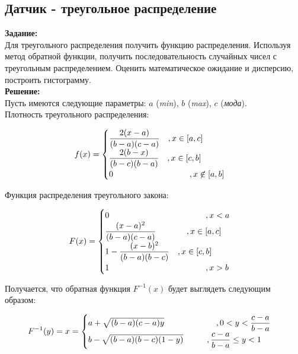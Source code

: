 \subsection*{Датчик - треугольное распределение}

\textbf{Задание:}\\
Для треугольного распределения получить функцию распределения. Используя метод обратной функции, получить последовательность случайных чисел с треугольным распределением. Оценить математическое ожидание и дисперсию, построить гистограмму.\\

\textbf{Решение:}\\
Пусть имеются следующие параметры: $a$ (\textit{min}), $b$ (\textit{max}), $c$ (\textit{мода}).\\
Плотность треугольного распределения:
\begin{ceqn}
	\begin{align*}
		f(x) =
		\begin{cases}
			\dfrac{2(x-a)}{(b-a)(c-a)} \quad , x \in [a,c]\\
			\dfrac{2(b-x)}{(b-c)(b-a)} \quad , x \in [c,b]\\
			0 \hspace{3.25cm} , x \centernot\in [a,b]\\
		\end{cases}
	\end{align*}
\end{ceqn}

Функция распределения треугольного закона:
\begin{ceqn}
	\begin{align*}
		F(x) =
		\begin{cases}
			0 \hspace{4.1cm} , x < a\\
			\dfrac{(x-a)^2}{(b-a)(c-a)} \hspace{1.3cm} , x \in [a,c]\\
			1 - \dfrac{(x-b)^2}{(b-a)(b-c)} \quad , x \in [c,b]\\
			1 \hspace{4.1cm} , x > b\\
		\end{cases}
	\end{align*}
\end{ceqn}

Получается, что обратная функция $F^{-1}(x)$ будет выглядеть следующим образом:
\begin{ceqn}
	\begin{align*}
		F^{-1}(y) = x =
		\begin{cases}
			a + \sqrt{(b-a)(c-a)y} \hspace{2.2cm} , 0 < y < \dfrac{c-a}{b-a}\\
			b - \sqrt{(b-a)(b-c)(1-y)} \hspace{1cm} , \dfrac{c-a}{b-a} \leq y < 1\\
		\end{cases}
	\end{align*}
\end{ceqn}

